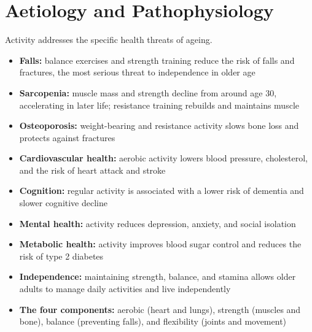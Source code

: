 \section*{Aetiology and Pathophysiology}
Activity addresses the specific health threats of ageing.
\begin{itemize}
    \item \textbf{Falls:} balance exercises and strength training reduce the risk of falls and fractures, the most serious threat to independence in older age
    \item \textbf{Sarcopenia:} muscle mass and strength decline from around age 30, accelerating in later life; resistance training rebuilds and maintains muscle
    \item \textbf{Osteoporosis:} weight-bearing and resistance activity slows bone loss and protects against fractures
    \item \textbf{Cardiovascular health:} aerobic activity lowers blood pressure, cholesterol, and the risk of heart attack and stroke
    \item \textbf{Cognition:} regular activity is associated with a lower risk of dementia and slower cognitive decline
    \item \textbf{Mental health:} activity reduces depression, anxiety, and social isolation
    \item \textbf{Metabolic health:} activity improves blood sugar control and reduces the risk of type 2 diabetes
    \item \textbf{Independence:} maintaining strength, balance, and stamina allows older adults to manage daily activities and live independently
    \item \textbf{The four components:} aerobic (heart and lungs), strength (muscles and bone), balance (preventing falls), and flexibility (joints and movement)
\end{itemize}

